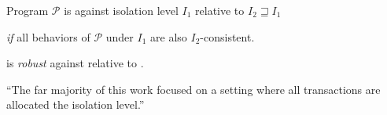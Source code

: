 
\begin{frame}{}
\end{frame}

\begin{frame}{}
	\begin{center}
		Program $\mathcal{P}$ is 
		against isolation level $I_{1}$ relative to $I_{2} \sqsupseteq I_{1}$


		{\it if } all behaviors of $\mathcal{P}$ under $I_{1}$
		are also $I_{2}$-consistent.
	\end{center}
\end{frame}

\begin{frame}{}
	\begin{center}
		 is \emph{robust} against \si{} relative to \ser.

	\end{center}
\end{frame}

\begin{frame}{}
	

	\pause
	\vspace{0.30cm}
	``The far majority of this work focused on
	  a  setting
		where all transactions are allocated
		the  isolation level.''
\end{frame}



